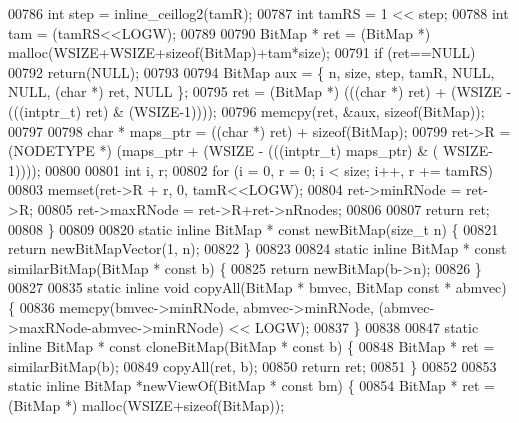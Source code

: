 \begin{DoxyCode}
00786         \textcolor{keywordtype}{int} step = inline\_ceillog2(tamR);
00787         \textcolor{keywordtype}{int} tamRS = 1 << step;
00788         \textcolor{keywordtype}{int} tam = (tamRS<<LOGW);
00789 
00790         BitMap * ret = (BitMap *) malloc(WSIZE+WSIZE+\textcolor{keyword}{sizeof}(BitMap)+tam*size);
00791         \textcolor{keywordflow}{if} (ret==NULL)
00792                 \textcolor{keywordflow}{return}(NULL);
00793 
00794         BitMap aux = \{ n, size, step, tamR, NULL, NULL, (\textcolor{keywordtype}{char} *) ret, NULL \};
00795         ret =  (BitMap *) (((\textcolor{keywordtype}{char} *) ret) + (WSIZE - (((intptr\_t) ret) & (WSIZE-1))));
00796         memcpy(ret, &aux, \textcolor{keyword}{sizeof}(BitMap));
00797 
00798         \textcolor{keywordtype}{char} * maps\_ptr = ((\textcolor{keywordtype}{char} *) ret) + \textcolor{keyword}{sizeof}(BitMap);
00799         ret->R = (NODETYPE *) (maps\_ptr + (WSIZE - (((intptr\_t) maps\_ptr) & (
      WSIZE-1))));
00800 
00801         \textcolor{keywordtype}{int} i, r;
00802         \textcolor{keywordflow}{for} (i = 0, r = 0; i < size; i++, r += tamRS)
00803                 memset(ret->R + r, 0, tamR<<LOGW);
00804         ret->minRNode = ret->R;
00805         ret->maxRNode = ret->R+ret->nRnodes;
00806 
00807         \textcolor{keywordflow}{return} ret;
00808 \}
00809 
00820 \textcolor{keyword}{static} \textcolor{keyword}{inline} BitMap * \textcolor{keyword}{const} newBitMap(\textcolor{keywordtype}{size\_t} n) \{
00821         \textcolor{keywordflow}{return} newBitMapVector(1, n);
00822 \}
00823 
00824 \textcolor{keyword}{static} \textcolor{keyword}{inline} BitMap * \textcolor{keyword}{const} similarBitMap(BitMap * \textcolor{keyword}{const} b) \{
00825         \textcolor{keywordflow}{return} newBitMap(b->n);
00826 \}
00827 
00835 \textcolor{keyword}{static} \textcolor{keyword}{inline} \textcolor{keywordtype}{void} copyAll(BitMap * bmvec, BitMap \textcolor{keyword}{const} * abmvec) \{
00836         memcpy(bmvec->minRNode, abmvec->minRNode, (abmvec->maxRNode-abmvec->minRNode) << 
      LOGW);
00837 \}
00838 
00847 \textcolor{keyword}{static} \textcolor{keyword}{inline} BitMap * \textcolor{keyword}{const} cloneBitMap(BitMap * \textcolor{keyword}{const} b) \{
00848         BitMap * ret = similarBitMap(b);
00849         copyAll(ret, b);
00850         \textcolor{keywordflow}{return} ret;
00851 \}
00852 
00853 \textcolor{keyword}{static} \textcolor{keyword}{inline} BitMap *newViewOf(BitMap * \textcolor{keyword}{const} bm) \{
00854         BitMap * ret = (BitMap *) malloc(WSIZE+\textcolor{keyword}{sizeof}(BitMap));

\end{DoxyCode}

